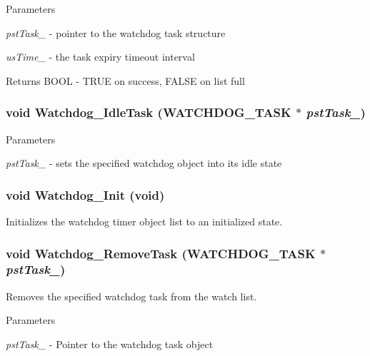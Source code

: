 \begin{DoxyParams}{Parameters}
\item[{\em pstTask\_\-}]-\/ pointer to the watchdog task structure \item[{\em usTime\_\-}]-\/ the task expiry timeout interval \end{DoxyParams}
\begin{DoxyReturn}{Returns}
BOOL -\/ TRUE on success, FALSE on list full 
\end{DoxyReturn}
\subsubsection[{Watchdog\_\-IdleTask}]{\setlength{\rightskip}{0pt plus 5cm}void Watchdog\_\-IdleTask ({\bf WATCHDOG\_\-TASK} $\ast$ {\em pstTask\_\-})}\label{watchdog_8c_a48cdfb15edeb242c57c6776e641b78ae}

\begin{DoxyParams}{Parameters}
\item[{\em pstTask\_\-}]-\/ sets the specified watchdog object into its idle state \end{DoxyParams}
\subsubsection[{Watchdog\_\-Init}]{\setlength{\rightskip}{0pt plus 5cm}void Watchdog\_\-Init (void)}\label{watchdog_8c_a495a07bd1939981855363ee899e619ed}
Initializes the watchdog timer object list to an initialized state. 
\subsubsection[{Watchdog\_\-RemoveTask}]{\setlength{\rightskip}{0pt plus 5cm}void Watchdog\_\-RemoveTask ({\bf WATCHDOG\_\-TASK} $\ast$ {\em pstTask\_\-})}\label{watchdog_8c_a8c02f00df13f4cee94781679638b82e7}
Removes the specified watchdog task from the watch list.


\begin{DoxyParams}{Parameters}
\item[{\em pstTask\_\-}]-\/ Pointer to the watchdog task object \end{DoxyParams}
